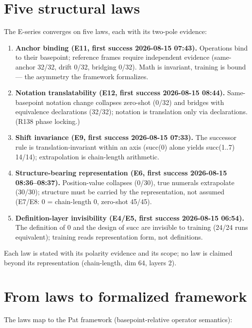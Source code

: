 \documentclass[sigplan,10pt,anonymous,review]{acmart}
\begin{document}
\section{Five structural laws}

The E-series converges on five laws, each with its two-pole evidence:

\begin{enumerate}
\item \textbf{Anchor binding (E11, first success 2026-08-15 07:43).}
Operations bind to their basepoint; reference frames require independent
evidence (same-anchor 32/32, drift 0/32, bridging 0/32). Math is
invariant, training is bound --- the asymmetry the framework formalizes.
\item \textbf{Notation translatability (E12, first success 2026-08-15
08:44).} Same-basepoint notation change collapses zero-shot (0/32) and
bridges with equivalence declarations (32/32); notation is translation
only via declarations. (R138 phase locking.)
\item \textbf{Shift invariance (E9, first success 2026-08-15 07:33).} The
successor rule is translation-invariant within an axis (succ(0) alone
yields succ(1..7) 14/14); extrapolation is chain-length arithmetic.
\item \textbf{Structure-bearing representation (E6, first success
2026-08-15 08:36--08:37).} Position-value collapses (0/30), true numerals
extrapolate (30/30); structure must be carried by the representation, not
assumed (E7/E8: 0 = chain-length 0, zero-shot 45/45).
\item \textbf{Definition-layer invisibility (E4/E5, first success
2026-08-15 06:54).} The definition of 0 and the design of succ are
invisible to training (24/24 runs equivalent); training reads
representation form, not definitions.
\end{enumerate}

Each law is stated with its polarity evidence and its scope; no law is
claimed beyond its representation (chain-length, dim 64, layers 2).

\section{From laws to formalized framework}

The laws map to the Pat framework (basepoint-relative operator semantics):
\end{document}
